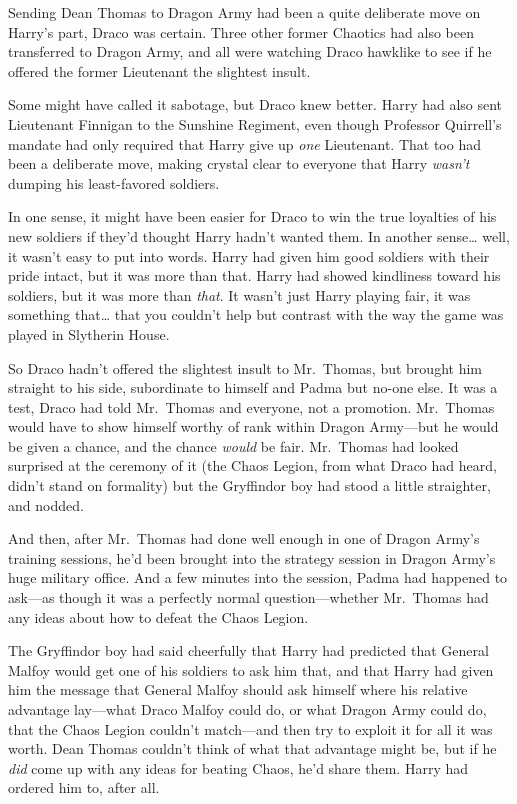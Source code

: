 Sending Dean Thomas to Dragon Army had been a quite deliberate move on Harry's part, Draco was certain. Three other former Chaotics had also been transferred to Dragon Army, and all were watching Draco hawklike to see if he offered the former Lieutenant the slightest insult.

Some might have called it sabotage, but Draco knew better. Harry had also sent Lieutenant Finnigan to the Sunshine Regiment, even though Professor Quirrell's mandate had only required that Harry give up \emph{one} Lieutenant. That too had been a deliberate move, making crystal clear to everyone that Harry \emph{wasn't} dumping his least-favored soldiers.

In one sense, it might have been easier for Draco to win the true loyalties of his new soldiers if they'd thought Harry hadn't wanted them. In another sense{\ldots} well, it wasn't easy to put into words. Harry had given him good soldiers with their pride intact, but it was more than that. Harry had showed kindliness toward his soldiers, but it was more than \emph{that}. It wasn't just Harry playing fair, it was something that{\ldots} that you couldn't help but contrast with the way the game was played in Slytherin House.

So Draco hadn't offered the slightest insult to Mr.~Thomas, but brought him straight to his side, subordinate to himself and Padma but no-one else. It was a test, Draco had told Mr.~Thomas and everyone, not a promotion. Mr.~Thomas would have to show himself worthy of rank within Dragon Army—but he would be given a chance, and the chance \emph{would} be fair. Mr.~Thomas had looked surprised at the ceremony of it (the Chaos Legion, from what Draco had heard, didn't stand on formality) but the Gryffindor boy had stood a little straighter, and nodded.

And then, after Mr.~Thomas had done well enough in one of Dragon Army's training sessions, he'd been brought into the strategy session in Dragon Army's huge military office. And a few minutes into the session, Padma had happened to ask—as though it was a perfectly normal question—whether Mr.~Thomas had any ideas about how to defeat the Chaos Legion.

The Gryffindor boy had said cheerfully that Harry had predicted that General Malfoy would get one of his soldiers to ask him that, and that Harry had given him the message that General Malfoy should ask himself where his relative advantage lay—what Draco Malfoy could do, or what Dragon Army could do, that the Chaos Legion couldn't match—and then try to exploit it for all it was worth. Dean Thomas couldn't think of what that advantage might be, but if he \emph{did} come up with any ideas for beating Chaos, he'd share them. Harry had ordered him to, after all.

